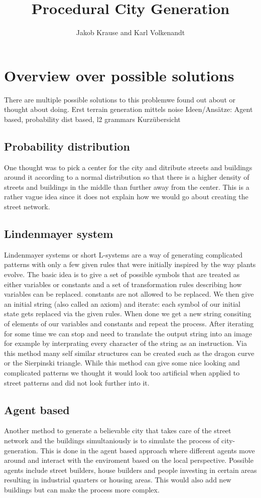 \documentclass{scrartcl}
\title{Procedural City Generation}
\author{Jakob Krause and Karl Volkenandt}
\begin{document}
\maketitle
\tableofcontents
\newpage

\section{Overview over possible solutions}
There are multiple possible solutions to this problemwe found out about or thought
about doing.
Erst terrain generation mittels noise
Ideen/Ansätze: Agent based, probability dist based, l2 grammars
Kurzübersicht

\subsection{Probability distribution}
One thought was to pick a center for the city and ditribute streets and buildings
around it according to a normal distribution so that there is a higher density of streets
and buildings in the middle than further away from the center. This is a rather vague
idea since it does not explain how we would go about creating the street network.

\subsection{Lindenmayer system}
Lindenmayer systems or short L-systems are a way of generating complicated patterns
with only a few given rules that were initially inspired by the way plants evolve.
The basic idea is to give a set of possible symbols that are treated as either variables
or constants and a set of transformation rules describing how variables can be replaced.
constants are not allowed to be replaced. We then give an initial string (also
called an axiom) and iterate: each symbol of our initial state gets replaced via the given rules.
When done we get a new string consiting of elements of our variables and constants
and repeat the process. After iterating for some time we can stop and need to
translate the output string into an image for example by interprating every character
of the string as an instruction. Via this method many self similar
structures can be created such as the dragon curve or the Sierpinski triangle.
While this method can give some nice looking and complicated patterns we thought
it would look too artificial when applied to street patterns and did not look further
into it.


\subsection{Agent based}
Another method to generate a believable city that takes care of the street network
and the buildings simultaniously is to simulate the process of
city-generation. This is done in the agent based approach where different agents
move around and interact with the enviroment based on the local perspective.
Possible agents include street builders, house builders and people investing in certain
areas resulting in industrial quarters or housing areas. This would also add new
buildings but can make the process more complex.
\end{document}
